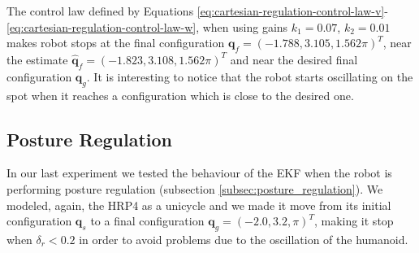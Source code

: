 \documentclass[a4paper]{article}
\begin{document}
The control law defined by Equations
\ref{eq:cartesian-regulation-control-law-v}-\ref{eq:cartesian-regulation-control-law-w},
when using gains $k_1=0.07$, $k_2=0.01$ makes robot stops at the final
configuration $\bm{q}_f = (-1.788, 3.105, 1.562\pi)^T$, near the estimate
$\bm{\hat{q}}_f = (-1.823, 3.108, 1.562\pi)^T$ and
near the desired final configuration $\bm{q}_g$. It is interesting to notice
that the robot starts oscillating on the spot when it reaches a configuration
which is close to the desired one.

\subsection{Posture Regulation}
In our last experiment we tested the behaviour of the EKF when the robot is
performing posture regulation (subsection \ref{subsec:posture_regulation}).
We modeled, again, the HRP4 as a unicycle and we made it move from its initial
configuration $\bm{q}_s$ to a final configuration $\bm{q}_g = (-2.0, 3.2, \pi)^T$,
making it stop when $\delta_r < 0.2$ in order to avoid problems due to
the oscillation of the humanoid.
\end{document}
